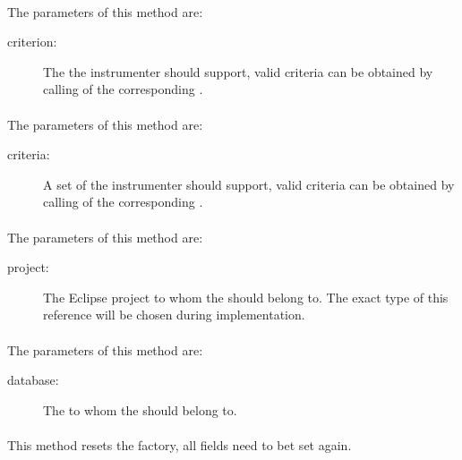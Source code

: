 \paragraph{} \label{Classes:Instrumentation:DefaultInstrumenterFactory:addCriterion}
The parameters of this method are:
\begin{description}
\item[criterion:] The  the instrumenter should support, valid criteria can be obtained by calling  of the corresponding .
\end{description}
\paragraph{} \label{Classes:Instrumentation:DefaultInstrumenterFactory:addCriteria}
The parameters of this method are:
\begin{description}
\item[criteria:] A set of  the instrumenter should support, valid criteria can be obtained by calling  of the corresponding .
\end{description}
\paragraph{} \label{Classes:Instrumentation:DefaultInstrumenterFactory:setProject}
The parameters of this method are:
\begin{description}
\item[project:] The Eclipse project to whom the  should belong to. The exact type of this reference will be chosen during implementation.
\end{description}
\paragraph{} \label{Classes:Instrumentation:DefaultInstrumenterFactory:setDatabase}
The parameters of this method are:
\begin{description}
\item[database:] The  to whom the  should belong to.
\end{description}
\paragraph{} \label{Classes:Instrumentation:DefaultInstrumenterFactory:reset}
This method resets the factory, all fields need to bet set again.
